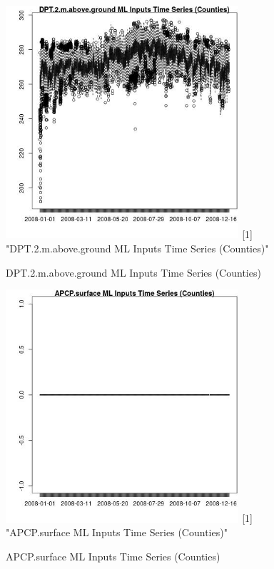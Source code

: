\begin{figure} 
\centering  
\includegraphics[width=0.77\textwidth]{Code_Outputs/ML_input_report_ML_input_CountyGeometricCentroids_Locations_Dates_part_c_2008-01-01to2008-12-31_DPT.2.m.above.groundTS.jpg} 
[1] "DPT.2.m.above.ground ML Inputs Time Series (Counties)"
\caption{\label{fig:ML_input_report_ML_input_CountyGeometricCentroids_Locations_Dates_part_c_2008-01-01to2008-12-31DPT.2.m.above.groundTS}DPT.2.m.above.ground ML Inputs Time Series (Counties)} 
\end{figure} 
 

\begin{figure} 
\centering  
\includegraphics[width=0.77\textwidth]{Code_Outputs/ML_input_report_ML_input_CountyGeometricCentroids_Locations_Dates_part_c_2008-01-01to2008-12-31_APCP.surfaceTS.jpg} 
[1] "APCP.surface ML Inputs Time Series (Counties)"
\caption{\label{fig:ML_input_report_ML_input_CountyGeometricCentroids_Locations_Dates_part_c_2008-01-01to2008-12-31APCP.surfaceTS}APCP.surface ML Inputs Time Series (Counties)} 
\end{figure} 
 

